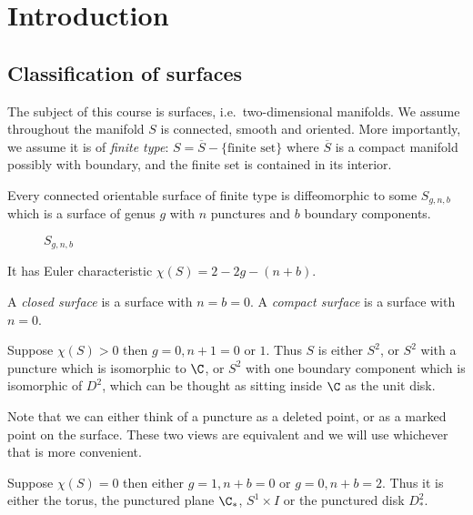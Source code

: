 \documentclass[a4paper]{article}
\begin{document}


\tableofcontents

\setcounter{section}{-1}

\section{Introduction}

\subsection{Classification of surfaces}

The subject of this course is surfaces, i.e.\ two-dimensional manifolds. We assume throughout the manifold \(S\) is connected, smooth and oriented. More importantly, we assume it is of \emph{finite type}: \(S = \overline S - \{\text{finite set}\}\) where \(\overline S\) is a compact manifold possibly with boundary, and the finite set is contained in its interior.

\begin{theorem}
  Every connected orientable surface of finite type is diffeomorphic to some \(S_{g, n, b}\) which is a surface of genus \(g\) with \(n\) punctures and \(b\) boundary components.
\end{theorem}

\begin{figure}[ht]
  \centering
  \def\svgwidth{.8\columnwidth}
  
  \caption{\(S_{g, n, b}\)}
\end{figure}

It has Euler characteristic \(\chi(S) = 2 - 2g - (n + b)\).

A \emph{closed surface} is a surface with \(n = b = 0\). A \emph{compact surface} is a surface with \(n = 0\).

\begin{eg}
  Suppose \(\chi(S) > 0\) then \(g = 0, n + 1 = 0 \text{ or } 1\). Thus \(S\) is either \(S^2\), or \(S^2\) with a puncture which is isomorphic to \(\C\), or \(S^2\) with one boundary component which is isomorphic of \(D^2\), which can be thought as sitting inside \(\C\) as the unit disk.

  Note that we can either think of a puncture as a deleted point, or as a marked point on the surface. These two views are equivalent and we will use whichever that is more convenient.
\end{eg}

\begin{eg}
  Suppose \(\chi(S) = 0\) then either \(g = 1, n + b = 0\) or \(g = 0, n + b = 2\). Thus it is either the torus, the punctured plane \(\C_*\), \(S^1 \times I\) or the punctured disk \(D^2_*\).
\end{eg}
\end{document}
